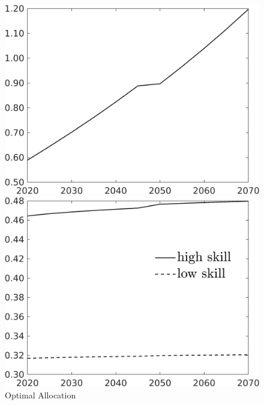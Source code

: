 \begin{figure}[h!!]
	\centering
	\caption{Optimal Allocation }\label{fig:optAll}
	
	
	\begin{minipage}[]{0.32\textwidth}
		\includegraphics[width=1\textwidth]{../../codding_model/own_basedOnFried/optimalPol_190722_tidiedUp/figures/all_Aout22/Single_OPT_T_NoTaus_C_regime3_spillover0_noskill0_sep1_xgrowth0_extern0_etaa0.79.png}
	\end{minipage}
	\begin{minipage}[]{0.32\textwidth}
		\includegraphics[width=1\textwidth]{../../codding_model/own_basedOnFried/optimalPol_190722_tidiedUp/figures/all_Aout22/SingleJointTOT_regime3_OPT_T_NoTaus_Labour_spillover0_noskill0_sep1_xgrowth0_extern0_PV1_etaa0.79_lgd1.png}

\end{minipage}
\end{figure}
